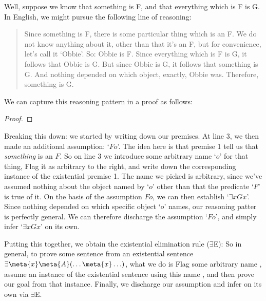 Well, suppose we know that something is F, and that everything which is F is G. In English, we might pursue the following line of reasoning:
	\begin{quote}
		Since something is F, there is some particular thing which is an F. We do not know anything about it, other than that it's an F, but for convenience, let's call it `Obbie'. So: Obbie is F. Since everything which is F is G, it follows that Obbie is G. But since Obbie is G, it follows that something is G. And nothing depended on which object, exactly, Obbie was. Therefore, something is G.
	\end{quote}
We can capture this reasoning pattern in a proof as follows:
\begin{proof}
	\open
		 
		 
	\close
\end{proof}\noindent
Breaking this down: we started by writing down our premises. At line 3, we then made an additional assumption: `$Fo$'. The idea here is that premise 1 tell us that \emph{something} is an $F$.  So on line 3 we introduce some arbitrary name `$o$' for that thing, Flag it as arbitrary to the right, and write down the corresponding instance of the existential premise 1.    The name we picked is arbitrary, since we've assumed nothing about the object named by `$o$' other than that the predicate `$F$' is true of it.  On the basis of the assumption $Fo$, we can then establish `$\exists xGx$'.  Since nothing depended on which specific object `$o$' names, our reasoning patter is perfectly general. We can therefore discharge the assumption `$Fo$', and simply infer `$\exists x Gx$' on its own.

Putting this together, we obtain the existential elimination rule ($\exists$E):
So in general, to prove some sentence  from an existential sentence $\exists \meta{x}\meta{A}(\ldots \meta{x} \ldots)$, what we do is Flag some arbitrary name , assume an instance of the existential sentence using this name , and then prove our goal  from that instance.  Finally, we discharge our assumption and infer  on its own via $\exists$E.

